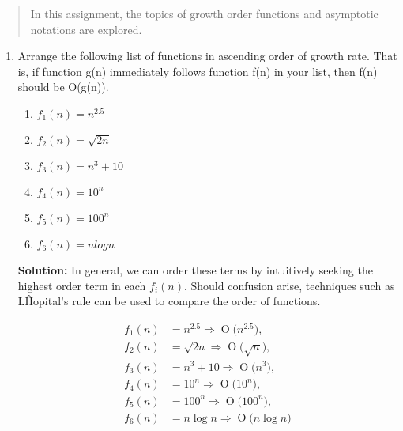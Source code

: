 \documentclass[11pts]{article}
\newcommand{\BigO}[1]{\ensuremath{\operatorname{O}\bigl(#1\bigr)}}
\begin{document}
\maketitle

\begin{abstract}
In this assignment, the topics of growth order functions and asymptotic 
notations are explored.
\end{abstract}
\newpage

\begin{enumerate}
\item Arrange the following list of functions in ascending
order of growth rate. That is, if function g(n) immediately follows function
f(n) in your list, then f(n) should be O(g(n)).

  \begin{enumerate}
  \item $f_1(n) = n^2.5$

  \item $f_2(n) = \sqrt{2n}$

  \item $f_3(n) = n^3 + 10$

  \item $f_4(n) = 10^n$

  \item $f_5(n) = 100^n$

  \item $f_6(n) = n log n$
  \end{enumerate}
    
  \textbf{Solution:} In general, we can order these terms by intuitively 
  seeking the highest order term in each $f_i(n)$. Should confusion arise, 
  techniques such as L\^Hopital's rule can be used to compare the
  order of functions.

  \begin{align*}
  f_1(n) &= n^{2.5}     \Rightarrow \BigO{n^{2.5}},   \\
  f_2(n) &= \sqrt{2n}   \Rightarrow \BigO{\sqrt{n}},    \\
  f_3(n) &= n^3 + 10    \Rightarrow \BigO{n^3},         \\
  f_4(n) &= 10^n        \Rightarrow \BigO{10^n},        \\
  f_5(n) &= 100^n       \Rightarrow \BigO{100^n},       \\
  f_6(n) &= n \log n    \Rightarrow \BigO{n \log n}
  \end{align*}


\end{enumerate}
\end{document}
